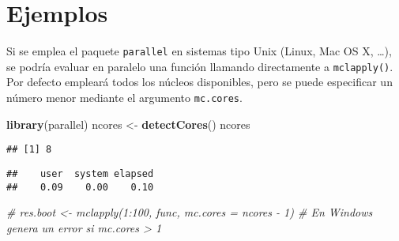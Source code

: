 \documentclass[
]{book}
\newenvironment{Shaded}{\begin{snugshade}}{\end{snugshade}}
\newcommand{\CommentTok}[1]{\textcolor[rgb]{0.56,0.35,0.01}{\textit{#1}}}
\newcommand{\ControlFlowTok}[1]{\textcolor[rgb]{0.13,0.29,0.53}{\textbf{#1}}}
\newcommand{\DataTypeTok}[1]{\textcolor[rgb]{0.13,0.29,0.53}{#1}}
\newcommand{\DecValTok}[1]{\textcolor[rgb]{0.00,0.00,0.81}{#1}}
\newcommand{\KeywordTok}[1]{\textcolor[rgb]{0.13,0.29,0.53}{\textbf{#1}}}
\newcommand{\NormalTok}[1]{#1}
\newcommand{\OperatorTok}[1]{\textcolor[rgb]{0.81,0.36,0.00}{\textbf{#1}}}
\newcommand{\OtherTok}[1]{\textcolor[rgb]{0.56,0.35,0.01}{#1}}
\newcommand{\StringTok}[1]{\textcolor[rgb]{0.31,0.60,0.02}{#1}}
\theoremstyle{definition}
\theoremstyle{definition}
\theoremstyle{definition}
\theoremstyle{remark}
\begin{document}
\hypertarget{ejemplos-1}{%
\section{Ejemplos}\label{ejemplos-1}}

Si se emplea el paquete \texttt{parallel} en sistemas tipo Unix (Linux, Mac OS X, \ldots), se podría
evaluar en paralelo una función llamando directamente a \texttt{mclapply()}.
Por defecto empleará todos los núcleos disponibles, pero se puede especificar un número menor
mediante el argumento \texttt{mc.cores}.

\begin{Shaded}
\begin{Highlighting}[]
\KeywordTok{library}\NormalTok{(parallel)}
\NormalTok{ncores <-}\StringTok{ }\KeywordTok{detectCores}\NormalTok{()}
\NormalTok{ncores}
\end{Highlighting}
\end{Shaded}

\begin{verbatim}
## [1] 8
\end{verbatim}

\begin{Shaded}
\end{Shaded}

\begin{verbatim}
##    user  system elapsed 
##    0.09    0.00    0.10
\end{verbatim}

\begin{Shaded}
\begin{Highlighting}[]
\CommentTok{# res.boot <- mclapply(1:100, func, mc.cores = ncores - 1) # En Windows genera un error si mc.cores > 1}
\end{Highlighting}
\end{Shaded}
\end{document}
